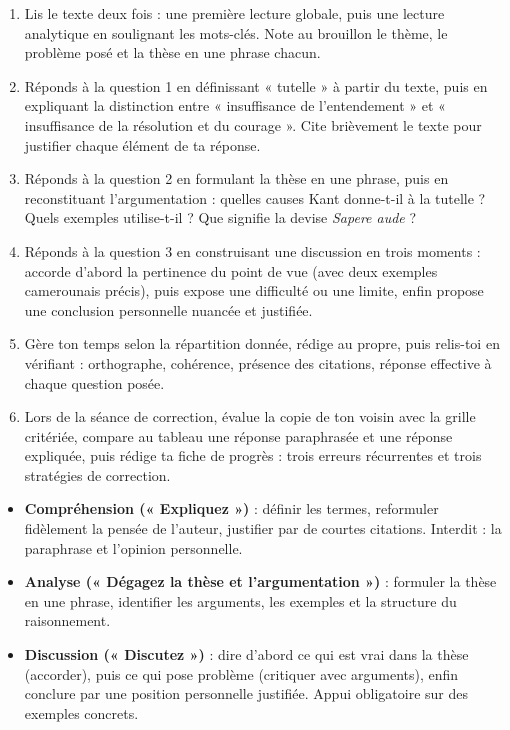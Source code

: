 \documentclass[11pt]{article}
\newcounter{popsec}
\newcounter{popsub}
\newcommand{\courssub}[1]{%
  \stepcounter{popsub}%
  \par\vspace{9pt}\noindent{\popxbold\fontsize{11.5}{13}\selectfont\color{popink}{\color{poporange}\thepopsec.\thepopsub}\hspace{6pt}#1}\par\nopagebreak\vspace{4pt}
}
\begin{document}
\begin{enumerate}
\item Lis le texte deux fois : une première lecture globale, puis une lecture analytique en soulignant les mots-clés. Note au brouillon le thème, le problème posé et la thèse en une phrase chacun.
\item Réponds à la question 1 en définissant « tutelle » à partir du texte, puis en expliquant la distinction entre « insuffisance de l'entendement » et « insuffisance de la résolution et du courage ». Cite brièvement le texte pour justifier chaque élément de ta réponse.
\item Réponds à la question 2 en formulant la thèse en une phrase, puis en reconstituant l'argumentation : quelles causes Kant donne-t-il à la tutelle ? Quels exemples utilise-t-il ? Que signifie la devise \emph{Sapere aude} ?
\item Réponds à la question 3 en construisant une discussion en trois moments : accorde d'abord la pertinence du point de vue (avec deux exemples camerounais précis), puis expose une difficulté ou une limite, enfin propose une conclusion personnelle nuancée et justifiée.
\item Gère ton temps selon la répartition donnée, rédige au propre, puis relis-toi en vérifiant : orthographe, cohérence, présence des citations, réponse effective à chaque question posée.
\item Lors de la séance de correction, évalue la copie de ton voisin avec la grille critériée, compare au tableau une réponse paraphrasée et une réponse expliquée, puis rédige ta fiche de progrès : trois erreurs récurrentes et trois stratégies de correction.
\end{enumerate}

\courssub{Ressources à mobiliser}

\begin{aretenir}
\begin{itemize}
\item \textbf{Compréhension (« Expliquez »)} : définir les termes, reformuler fidèlement la pensée de l'auteur, justifier par de courtes citations. Interdit : la paraphrase et l'opinion personnelle.
\item \textbf{Analyse (« Dégagez la thèse et l'argumentation »)} : formuler la thèse en une phrase, identifier les arguments, les exemples et la structure du raisonnement.
\item \textbf{Discussion (« Discutez »)} : dire d'abord ce qui est vrai dans la thèse (accorder), puis ce qui pose problème (critiquer avec arguments), enfin conclure par une position personnelle justifiée. Appui obligatoire sur des exemples concrets.
\end{itemize}
\end{aretenir}
\end{document}

